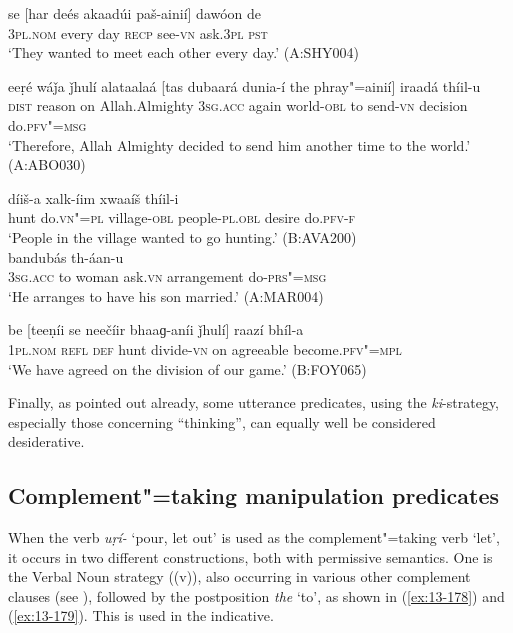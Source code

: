 \begin{exe}
\ex
\label{ex:13-173}
\gll se [har deés akaadúi paš-ainií] dawóon de \\
\textsc{3pl.nom} every day \textsc{recp} see-\textsc{vn} ask.\textsc{3pl} \textsc{pst} \\
\glt `They wanted to meet each other every day.' (A:SHY004)

\ex
\label{ex:13-174}
\gll eeṛé wáǰa ǰhulí alataalaá [tas dubaará dunia-í  the phray"=ainií] iraadá thíil-u \\
\textsc{dist} reason on Allah.Almighty \textsc{3sg.acc} again world-\textsc{obl}  to send-\textsc{vn} decision do.\textsc{pfv"=msg}  \\
\glt `Therefore, Allah Almighty decided to send him another time to the world.' (A:ABO030)

\ex
\label{ex:13-175}
 díiš-a xalk-íim xwaaíš thíil-i \\
hunt do.\textsc{vn"=pl} village-\textsc{obl} people-\textsc{pl.obl} desire do.\textsc{pfv-f} \\
\glt `People in the village wanted to go hunting.' (B:AVA200) \\

\ex
\label{ex:13-176}
 bandubás th-áan-u \\
\textsc{3sg.acc} to woman ask.\textsc{vn}  arrangement do-\textsc{prs"=msg} \\
\glt `He arranges to have his son married.' (A:MAR004)

\ex
\label{ex:13-177}
\gll be [teeṇíi se neečíir bhaaɡ-aníi ǰhulí]  raazí bhíl-a \\
\textsc{1pl.nom} \textsc{refl} \textsc{def} hunt divide-\textsc{vn} on agreeable become.\textsc{pfv"=mpl} \\
\glt `We have agreed on the division of our game.' (B:FOY065) 
\end{exe}

Finally, as pointed out already, some utterance predicates, using the \textit{ki}-strategy, especially those concerning ``thinking'', can equally well be considered desiderative.


\subsection{Complement"=taking manipulation predicates}
\label{subsec:13-5-3}

 When the verb \textit{uṛí-} `pour, let out' is used as the complement"=taking verb `let', it occurs in two different constructions, both with permissive semantics. One is the Verbal Noun strategy ((v)), also occurring in various other complement clauses (see ), followed by the postposition \textit{the} `to', as shown in (\ref{ex:13-178}) and (\ref{ex:13-179}). This is used in the indicative.

